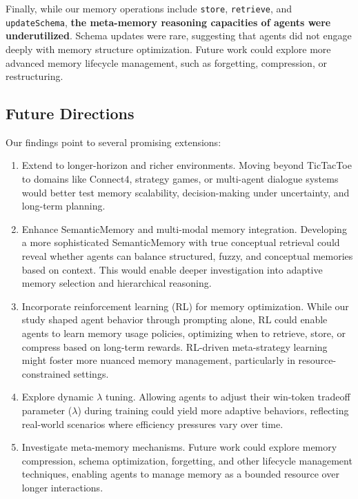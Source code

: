 \documentclass[10pt]{article}
\begin{document}
Finally, while our memory operations include \texttt{store}, \texttt{retrieve}, and \texttt{updateSchema}, \textbf{the meta-memory reasoning capacities of agents were underutilized}. Schema updates were rare, suggesting that agents did not engage deeply with memory structure optimization. Future work could explore more advanced memory lifecycle management, such as forgetting, compression, or restructuring.

\subsection{Future Directions}

Our findings point to several promising extensions:
\begin{enumerate}
    \item Extend to longer-horizon and richer environments. Moving beyond TicTacToe to domains like Connect4, strategy games, or multi-agent dialogue systems would better test memory scalability, decision-making under uncertainty, and long-term planning.
    
    \item Enhance SemanticMemory and multi-modal memory integration. Developing a more sophisticated SemanticMemory with true conceptual retrieval could reveal whether agents can balance structured, fuzzy, and conceptual memories based on context. This would enable deeper investigation into adaptive memory selection and hierarchical reasoning.
    
    \item Incorporate reinforcement learning (RL) for memory optimization. While our study shaped agent behavior through prompting alone, RL could enable agents to learn memory usage policies, optimizing when to retrieve, store, or compress based on long-term rewards. RL-driven meta-strategy learning might foster more nuanced memory management, particularly in resource-constrained settings.
    
    \item Explore dynamic $\lambda$ tuning. Allowing agents to adjust their win-token tradeoff parameter ($\lambda$) during training could yield more adaptive behaviors, reflecting real-world scenarios where efficiency pressures vary over time.
    
    \item Investigate meta-memory mechanisms. Future work could explore memory compression, schema optimization, forgetting, and other lifecycle management techniques, enabling agents to manage memory as a bounded resource over longer interactions.
\end{enumerate}
\end{document}
